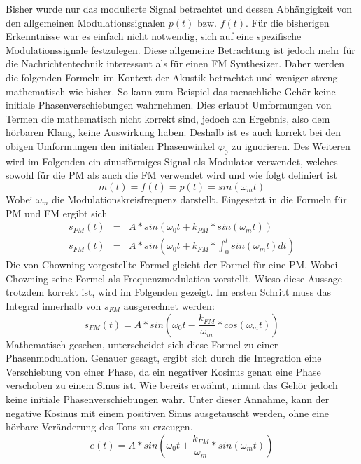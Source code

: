 Bisher wurde nur das modulierte Signal betrachtet und dessen Abhängigkeit von den allgemeinen Modulationssignalen \(p(t)\) bzw. \(f(t)\). Für die bisherigen Erkenntnisse war es einfach nicht notwendig, sich auf eine spezifische Modulationssignale festzulegen. Diese allgemeine Betrachtung ist jedoch mehr für die Nachrichtentechnik interessant als für einen FM Synthesizer.
Daher werden die folgenden Formeln im Kontext der Akustik betrachtet und weniger streng mathematisch wie bisher. So kann zum Beispiel das menschliche Gehör keine initiale Phasenverschiebungen wahrnehmen. Dies erlaubt Umformungen von Termen die mathematisch nicht korrekt sind, jedoch am Ergebnis, also dem hörbaren Klang, keine Auswirkung haben. Deshalb ist es auch korrekt bei den obigen Umformungen den initialen Phasenwinkel $\varphi_0$ zu ignorieren. Des Weiteren wird im Folgenden ein sinusförmiges Signal als Modulator verwendet, welches sowohl für die PM als auch die FM verwendet wird und wie folgt definiert ist
\begin{equation}
m(t)=f(t)=p(t)=sin(\omega_m t)
\end{equation}
Wobei \(\omega_m\) die Modulationskreisfrequenz darstellt. Eingesetzt in die Formeln für PM und FM ergibt sich
\begin{eqnarray*}
s_{PM}(t)&=&A*sin(\omega_0t+k_{PM}*sin(\omega_m t)) \\
s_{FM}(t)&=&A*sin(\omega_0t+k_{FM}*\int_0^t{sin(\omega_m t)} dt)
\end{eqnarray*}
Die von Chowning vorgestellte Formel gleicht der Formel für eine PM. \cite{chowningPaper} Wobei Chowning seine Formel als Frequenzmodulation vorstellt. Wieso diese Aussage trotzdem korrekt ist, wird im Folgenden gezeigt. Im ersten Schritt muss das Integral innerhalb von \(s_{FM}\) ausgerechnet werden:
\begin{equation*}
s_{FM}(t)=A*sin(\omega_0t-\frac{k_{FM}}{\omega_m}*cos(\omega_m t))
\end{equation*}
Mathematisch gesehen, unterscheidet sich diese Formel zu einer Phasenmodulation. Genauer gesagt, ergibt sich durch die Integration eine Verschiebung von einer Phase, da ein negativer Kosinus genau eine Phase verschoben zu einem Sinus ist. Wie bereits erwähnt, nimmt das Gehör jedoch keine initiale Phasenverschiebungen wahr. Unter dieser Annahme, kann der negative Kosinus mit einem positiven Sinus ausgetauscht werden, ohne eine hörbare Veränderung des Tons zu erzeugen.
\begin{equation*}
e(t)=A*sin(\omega_0t+\frac{k_{FM}}{\omega_m}*sin(\omega_m t))
\end{equation*}
